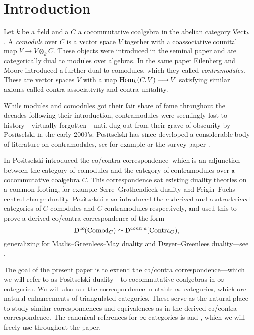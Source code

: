 
\section{Introduction}

Let $k$ be a field and a $C$ a cocommutative coalgebra in the abelian category $\mathrm{Vect}_k$. A \emph{comodule} over $C$ is a vector space $V$ together with a coassociative counital map $V\to V\otimes_k C$. These objects were introduced in the seminal paper \cite{eilenberg-moore_65} and are categorically dual to modules over algebras. In the same paper Eilenberg and Moore introduced a further dual to comodules, which they called \emph{contramodules}. These are vector spaces $V$ with a map $\operatorname{Hom}_k(C, V)\longrightarrow V$ satisfying similar axioms called contra-associativity and contra-unitality. 

While modules and comodules got their fair share of fame throughout the decades following their introduction, contramodules were seemingly lost to history---virtually forgotten---until dug out from their grave of obscurity by Positselski in the early 2000's. Positselski has since developed a considerable body of literature on contramodules, see for example \cite{positselski_2010, positselski_2011, positselski_2016, positselski_2017_contraadjusted, positselski_2020} or the survey paper \cite{positselski_2022_contramodules}. 

In \cite{positselski_2010} Positselski introduced the co/contra correspondence, which is an adjunction between the category of comodules and the category of contramodules over a cocommutative coalgebra $C$. This correspondence sat existing duality theories on a common footing, for example Serre--Grothendieck duality and Feigin--Fuchs central charge duality. Positselski also introduced the coderived and contraderived categories of $C$-comodules and $C$-contramodules respectively, and used this to prove a derived co/contra correspondence of the form 
\[\mathrm{D}^{co}(\mathrm{Comod}_C)\simeq \mathrm{D}^{contra}(\mathrm{Contra}_C),\]
generalizing for Matlis--Greenlees--May duality and Dwyer--Greenlees duality---see \cite{positselski_2016}. 

The goal of the present paper is to extend the co/contra correspondence---which we will refer to as Positselski duality---to cocommutative coalgebras in $\infty$-categories. We will also use the correspondence in stable $\infty$-categories, which are natural enhancements of triangulated categories. These serve as the natural place to study similar correspondences and equivalences as in the derived co/contra correspondence. The canonical references for $\infty$-categories is \cite{lurie_09} and \cite{Lurie_HA}, which we will freely use throughout the paper. 




